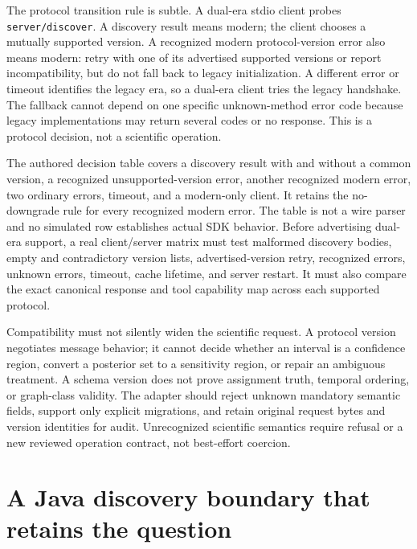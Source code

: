 The protocol transition rule is subtle. A dual-era stdio client probes
\texttt{server/discover}. A discovery result means modern; the client chooses
a mutually supported version. A recognized modern protocol-version error
also means modern: retry with one of its advertised supported versions or
report incompatibility, but do not fall back to legacy initialization. A
different error or timeout identifies the legacy era, so a dual-era client
tries the legacy handshake. The fallback cannot depend on one specific
unknown-method error code because legacy implementations may return several
codes or no response. This is a protocol decision, not a scientific
operation.~\citep{v12_mcp_stdio,v12_mcp_versioning}

The authored decision table covers a discovery result with and without a
common version, a recognized unsupported-version error, another recognized
modern error, two ordinary errors, timeout, and a modern-only client. It
retains the no-downgrade rule for every recognized modern error. The table is
not a wire parser and no simulated row establishes actual SDK behavior. Before
advertising dual-era support, a real client/server matrix must test malformed
discovery bodies, empty and contradictory version lists, advertised-version
retry, recognized errors, unknown errors, timeout, cache lifetime, and server
restart. It must also compare the exact canonical response and tool capability
map across each supported protocol.~\citep{exec17_continuity_reference,exec17_continuity_contract}

Compatibility must not silently widen the scientific request. A protocol
version negotiates message behavior; it cannot decide whether an interval is
a confidence region, convert a posterior set to a sensitivity region, or
repair an ambiguous treatment. A schema version does not prove assignment
truth, temporal ordering, or graph-class validity. The adapter should reject
unknown mandatory semantic fields, support only explicit migrations, and
retain original request bytes and version identities for audit. Unrecognized
scientific semantics require refusal or a new reviewed operation contract,
not best-effort coercion.
\citep{v12_mcp_basic,exec16_parity_design}


\label{exec17:continuity-end}


\hypertarget{a-java-discovery-boundary-that-retains-the-question}{%
\section{A Java discovery boundary that retains the
question}\label{a-java-discovery-boundary-that-retains-the-question}}

